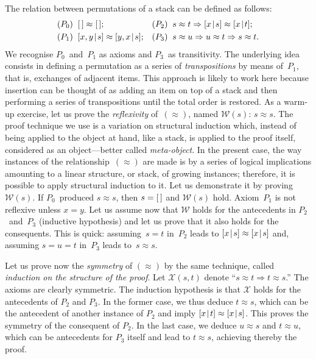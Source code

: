 The relation between permutations of a stack can be defined as
follows:
\begin{align*}
(P_0)\; & \; \el \approx \el;
& 
(P_2)\; &\; s \approx t \Rightarrow \cons{x}{s} \approx \cons{x}{t};\\
(P_1)\; &\; \cons{x,y}{s} \approx \cons{y,x}{s};
&
(P_3)\; &\; s \approx u \Rightarrow u \approx t \Rightarrow s \approx t.
\end{align*}
We recognise \(P_0\)~and~\(P_1\) as axioms and \(P_3\)~as
transitivity. The underlying idea consists in defining a permutation
as a series of \emph{transpositions} by means of~\(P_1\), that is,
exchanges of adjacent items. This approach is likely to work here
because insertion can be thought of as adding an item on top of a
stack and then performing a series of transpositions until the total
order is restored. As a warm\hyp{}up exercise, let us prove the
\emph{reflexivity} of~\((\approx)\), named \(\mathcal{W}(s)\): \(s
\approx s\). The proof technique we use is a variation on structural
induction which, instead of being applied to the object at hand, like
a stack, is applied to the proof itself, considered as an
object---better called \emph{meta\hyp{}object}. In the present case,
the way instances of the relationship~\((\approx)\) are made is by a
series of logical implications amounting to a linear structure, or
stack, of growing instances; therefore, it is possible to apply
structural induction to it. Let us demonstrate it by
proving~\(\mathcal{W}(s)\). If \(P_0\)~produced \(s \approx s\), then
\({s=[\,]}\) and \(\mathcal{W}(s)\) hold. Axiom~\(P_1\) is not
reflexive unless \({x=y}\). Let us assume now that \(\mathcal{W}\)
holds for the antecedents in \(P_2\)~and~\(P_3\) (inductive
hypothesis) and let us prove that it also holds for the
consequents. This is quick: assuming~\({s=t}\) in~\(P_2\) leads to
\([{x}\!\mid\!{s}] \approx [{x}\!\mid\!{s}]\) and, assuming \(s=u=t\) in~\(P_3\)
leads to~\({s \approx s}\).

Let us prove now the \emph{symmetry} of \((\approx)\) by the same
technique, called \emph{induction on the structure of the proof}. Let
\(\mathcal{X}(s,t)\) denote ``\(s \approx t \Rightarrow t \approx
s\).'' The axioms are clearly symmetric. The induction hypothesis is
that \(\mathcal{X}\) holds for the antecedents of \(P_2\) and
\(P_3\). In the former case, we thus deduce \(t \approx s\), which can
be the antecedent of another instance of \(P_2\) and imply
\([{x}\!\mid\!{t}] \approx [{x}\!\mid\!{s}]\). This proves the symmetry of the
consequent of \(P_2\). In the last case, we deduce \(u \approx s\) and
\(t \approx u\), which can be antecedents for \(P_3\) itself and lead
to \(t \approx s\), achieving thereby the proof.


